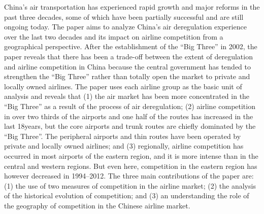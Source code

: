 China’s air transportation has experienced rapid growth and major reforms in the past three decades, some of which have been partially successful and are still ongoing today. The paper aims to analyze China’s air deregulation experience over the last two decades and its impact on airline competition from a geographical perspective. After the establishment of the “Big Three” in 2002, the paper reveals that there has been a trade-off between the extent of deregulation and airline competition in China because the central government has tended to strengthen the “Big Three” rather than totally open the market to private and locally owned airlines. The paper uses each airline group as the basic unit of analysis and reveals that (1) the air market has been more concentrated in the “Big Three” as a result of the process of air deregulation; (2) airline competition in over two thirds of the airports and one half of the routes has increased in the last 18years, but the core airports and trunk routes are chiefly dominated by the “Big Three”. The peripheral airports and thin routes have been operated by private and locally owned airlines; and (3) regionally, airline competition has occurred in most airports of the eastern region, and it is more intense than in the central and western regions. But even here, competition in the eastern region has however decreased in 1994–2012. The three main contributions of the paper are: (1) the use of two measures of competition in the airline market; (2) the analysis of the historical evolution of competition; and (3) an understanding the role of the geography of competition in the Chinese airline market.